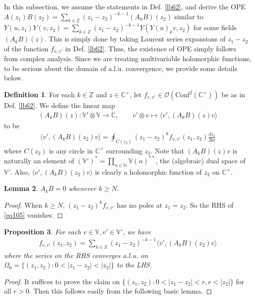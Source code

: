 \documentclass[12pt,a4paper,notitlepage]{article}
\theoremstyle{definition}
\newtheorem{df}{Definition}[section]
\theoremstyle{plain}
\newtheorem{pp}[df]{Proposition}
\newtheorem{lm}[df]{Lemma}
\newcommand{\Conf}{\mathrm{Conf}}
\newcommand{\bk}[1]{\langle {#1}\rangle}
\newcommand{\bigbk}[1]{\big\langle {#1}\big\rangle}
\newcommand{\scr}{\mathscr}
\newcommand{\im}{\mathbf{i}}
\newcommand{\Vbb}{\mathbb V}
\newcommand{\Cbb}{\mathbb C}
\newcommand{\Nbb}{\mathbb N}
\newcommand{\Zbb}{\mathbb Z}
\numberwithin{equation}{section}
\begin{document}
In this subsection, we assume the statements in Def. \ref{lb62}, and derive the OPE $A(z_1)B(z_2)=\sum_{k\in\Zbb}(z_1-z_2)^{-k-1}(A_kB)(z_2)$ similar to $Y(u,z_1)Y(v,z_2)=\sum_{k\in\Zbb}(z_1-z_2)^{-k-1}Y(Y(u)_kv,z_2)$ for some fields $(A_kB)(z)$. This is simply done by taking Laurent series expansions of $z_1-z_2$ of the function $f_{v,v'}$ in Def. \ref{lb62}. Thus, the existence of OPE simply follows from complex analysis. Since we are treating multivariable holomorphic functions, to be serious about the domain of a.l.u. convergence, we provide some details below.

\begin{df}
For each $k\in\Zbb$ and $z\in\Cbb^\times$, let $f_{v,v'}\in\scr O(\Conf^2(\Cbb^\times))$ be as in Def. \ref{lb62}. We define the linear map 
\begin{align*}
(A_kB)(z):\Vbb'\otimes \Vbb\rightarrow\Cbb,\qquad v'\otimes v\mapsto\bk{v',(A_kB)(z)v}	
\end{align*}
to be
\begin{align}
\bk{v',(A_kB)(z_2)v}=\oint_{C(z_2)}	(z_1-z_2)^kf_{v,v'}(z_1,z_2)\frac{dz_1}{2\im\pi}\label{eq105}
\end{align}
where $C(z_2)$ is any circle in $\Cbb^\times$ surrounding $z_2$. Note that $(A_kB)(z)v$ is naturally an element of $(\Vbb')^*=\prod_{n\in\Nbb}\Vbb(n)^{**}$, the (algebraic) dual space of $\Vbb'$. Also, $\bigbk{v',(A_kB)(z_2)v}$ is clearly a holomorphic function of $z_2$ on $\Cbb^\times$.
\end{df}	

\begin{lm}
$A_kB=0$ whenever $k\geq N$.
\end{lm}
\begin{proof}
When $k\geq N$, $(z_1-z_2)^kf_{v,v'}$ has no poles at $z_1=z_2$. So the RHS of \eqref{eq105} vanishes.
\end{proof}



\begin{pp}\label{lb73}
For each $v\in\Vbb,v'\in\Vbb'$, we have
\begin{align}
f_{v,v'}(z_1,z_2)=	\sum_{k\in\Zbb}(z_1-z_2)^{-k-1}\bigbk{v',(A_kB)(z_2)v}\label{eq112}
\end{align}
where the series on the RHS converges a.l.u. on $\Omega_0=\{(z_1,z_2):0<|z_1-z_2|<|z_2|\}$ to the LHS.
\end{pp}


\begin{proof}
It suffices to prove the claim on $\{(z_1,z_2):0<|z_1-z_2|<r,r<|z_2|\}$ for all $r>0$. Then this follows easily from the following basic lemma.
\end{proof}
\end{document}

